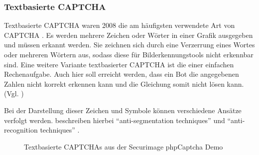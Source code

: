 \subsubsection*{Textbasierte CAPTCHA}
Textbasierte CAPTCHA waren 2008 die am häufigsten verwendete Art von CAPTCHA \cite[p.1]{usabilityofcaptchas}.
Es werden mehrere Zeichen oder Wörter in einer Grafik ausgegeben und müssen erkannt werden.
Sie zeichnen sich durch eine Verzerrung eines Wortes oder mehreren Wörtern aus, sodass diese für Bilderkennungstools nicht erkennbar sind.
Eine weitere Variante textbasierter CAPTCHA ist die einer einfachen Rechenaufgabe. 
Auch hier soll erreicht werden, dass ein Bot die angegebenen Zahlen nicht korrekt erkennen kann und die Gleichung somit nicht lösen kann. (Vgl. \cite[p.1]{usabilityofcaptchas} \cite[p.75]{surveyofresearch} \cite{shinde2018DIFFERENTTO}) %

Bei der Darstellung dieser Zeichen und Symbole können verschiedene Ansätze verfolgt werden.
\citeauthor{surveyofresearch} beschreiben hierbei ``anti-segmentation techniques'' und ``anti-recognition techniques'' \cite[p.76]{surveyofresearch}.

\begin{figure}[h!]
    \centering
    \qquad
    \caption{Textbasierte CAPTCHAs aus der Securimage phpCaptcha Demo}   
    \label{fig:textbased}
\end{figure}

\pagebreak

